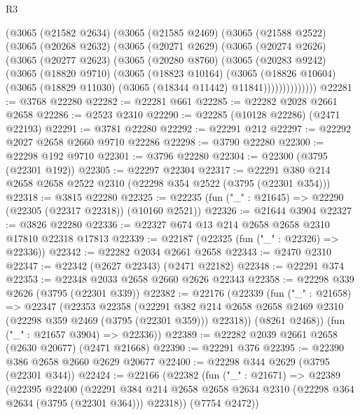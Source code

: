 \begin{lexlean}{R3}
\begin{coremodule}
    (@3065
      (@21582 @2634)
      (@3065
        (@21585 @2469)
        (@3065
          (@21588 @2522)
          (@3065
            (@20268 @2632)
            (@3065
              (@20271 @2629)
              (@3065
                (@20274 @2626)
                (@3065
                  (@20277 @2623)
                  (@3065
                    (@20280 @8760)
                    (@3065
                      (@20283 @9242)
                      (@3065
                        (@18820 @9710)
                        (@3065
                          (@18823 @10164)
                          (@3065
                            (@18826 @10604)
                            (@3065 (@18829 @11030) (@3065 (@18344 @11442) @11841))))))))))))))
@22281 := @3768 @22280
@22282 := @22281 @661
@22285 := @22282 @2028 @2661 @2658
@22286 := @2523 @2310
@22290 := @22285 (@10128 @22286) (@2471 @22193)
@22291 := @3781 @22280
@22292 := @22291 @212
@22297 := @22292 @2027 @2658 @2660 @9710 @22286
@22298 := @3790 @22280
@22300 := @22298 @192 @9710
@22301 := @3796 @22280
@22304 := @22300 (@3795 (@22301 @192))
@22305 := @22297 @22304
@22317 := @22291 @380 @214 @2658 @2658 @2522 @2310 (@22298 @354 @2522 (@3795 (@22301 @354)))
@22318 := @3815 @22280
@22325 := @22235 (fun ("_" : @21645) => @22290 (@22305 (@22317 @22318)) (@10160 @2521))
@22326 := @21644 @3904
@22327 := @3826 @22280
@22336 := @22327 @674 @13 @214 @2658 @2658 @2310 @17810 @22318 @17813
@22339 := @22187 (@22325 (fun ("_" : @22326) => @22336))
@22342 := @22282 @2034 @2661 @2658
@22343 := @2470 @2310
@22347 := @22342 (@2627 @22343) (@2471 @22182)
@22348 := @22291 @374
@22353 := @22348 @2033 @2658 @2660 @2626 @22343
@22358 := @22298 @339 @2626 (@3795 (@22301 @339))
@22382 := @22176
    (@22339
      (fun ("_" : @21658) =>
      @22347
        (@22353
          @22358
          (@22291
            @382
            @214
            @2658
            @2658
            @2469
            @2310
            (@22298 @359 @2469 (@3795 (@22301 @359)))
            @22318))
        (@8261 @2468))
      (fun ("_" : @21657 @3904) => @22336))
@22389 := @22282 @2039 @2661 @2658 (@2630 @20677) (@2471 @21668)
@22390 := @22291 @376
@22395 := @22390 @386 @2658 @2660 @2629 @20677
@22400 := @22298 @344 @2629 (@3795 (@22301 @344))
@22424 := @22166
    (@22382
      (fun ("_" : @21671) =>
      @22389
        (@22395
          @22400
          (@22291
            @384
            @214
            @2658
            @2658
            @2634
            @2310
            (@22298 @364 @2634 (@3795 (@22301 @364)))
            @22318))
        (@7754 @2472))

\end{coremodule}
\end{lexlean}
